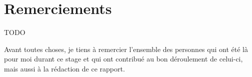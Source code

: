 \section*{Remerciements}


TODO

\vspace{12pt}

Avant toutes choses, je tiens à remercier l'ensemble des personnes qui ont été là pour moi durant ce stage
et qui ont contribué au bon déroulement de celui-ci, mais aussi à la rédaction de ce rapport.

